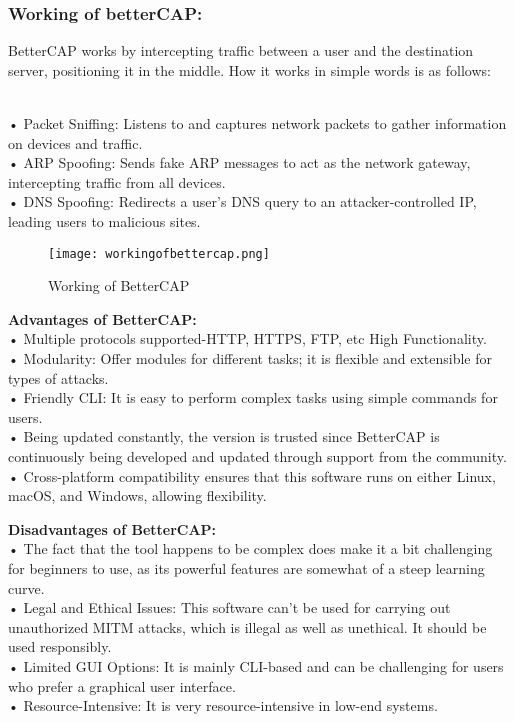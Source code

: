 \documentclass[conference]{IEEEtran}
\begin{document}
\subsubsection{Working of betterCAP: }

BetterCAP works by intercepting traffic between a user and the destination server, positioning it in the middle. How it works in simple words is as follows:


\\• Packet Sniffing: Listens to and captures network packets to gather information on devices and traffic.
\\• ARP Spoofing: Sends fake ARP messages to act as the network gateway, intercepting traffic from all devices.
\\• DNS Spoofing: Redirects a user's DNS query to an attacker-controlled IP, leading users to malicious sites.
\begin{figure}[h]
    \centering
    \texttt{[image: workingofbettercap.png]}
    \caption{Working of BetterCAP}
\end{figure}

\textbf{Advantages of BetterCAP:}
\\• Multiple protocols supported-HTTP, HTTPS, FTP, etc High Functionality.
\\• Modularity: Offer modules for different tasks; it is flexible and extensible for types of attacks.
\\• Friendly CLI: It is easy to perform complex tasks using simple commands for users.
\\• Being updated constantly, the version is trusted since BetterCAP is continuously being developed and updated through support from the community.
\\• Cross-platform compatibility ensures that this software runs on either Linux, macOS, and Windows, allowing flexibility.

\textbf{Disadvantages of BetterCAP:}
\\• The fact that the tool happens to be complex does make it a bit challenging for beginners to use, as its powerful features are somewhat of a steep learning curve.
\\• Legal and Ethical Issues: This software can't be used for carrying out unauthorized MITM attacks, which is illegal as well as unethical. It should be used responsibly.
\\• Limited GUI Options: It is mainly CLI-based and can be challenging for users who prefer a graphical user interface.
\\• Resource-Intensive: It is very resource-intensive in low-end systems.
\end{document}
